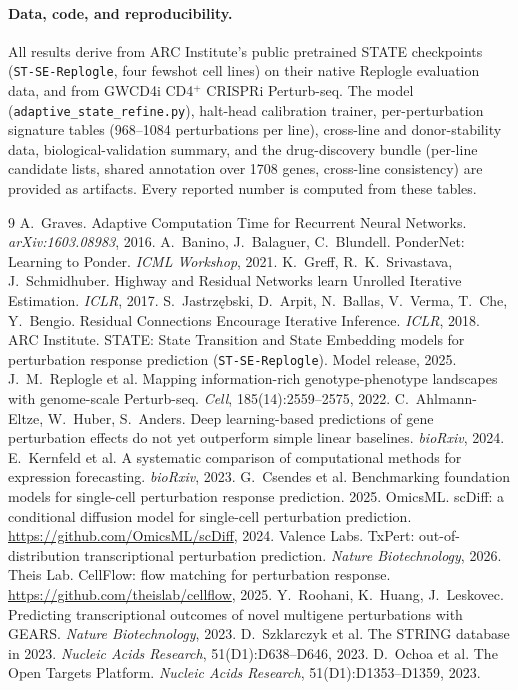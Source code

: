 \documentclass[11pt]{article}
\begin{document}
\paragraph{Data, code, and reproducibility.} All results derive from ARC Institute's public
pretrained STATE checkpoints (\texttt{ST-SE-Replogle}, four fewshot cell lines) on their native
Replogle evaluation data, and from GWCD4i CD4$^+$ CRISPRi Perturb-seq. The model
(\texttt{adaptive\_state\_refine.py}), halt-head calibration trainer, per-perturbation signature tables (968--1084
perturbations per line), cross-line and donor-stability data, biological-validation summary, and
the drug-discovery bundle (per-line candidate lists, shared annotation over 1708 genes, cross-line
consistency) are provided as artifacts. Every reported number is computed from these tables.

\begin{thebibliography}{9}
\small
{} A.~Graves. Adaptive Computation Time for Recurrent Neural Networks.
\emph{arXiv:1603.08983}, 2016.
 A.~Banino, J.~Balaguer, C.~Blundell. PonderNet: Learning to Ponder.
\emph{ICML Workshop}, 2021.
 K.~Greff, R.~K.~Srivastava, J.~Schmidhuber. Highway and Residual
Networks learn Unrolled Iterative Estimation. \emph{ICLR}, 2017.
 S.~Jastrz\k{e}bski, D.~Arpit, N.~Ballas, V.~Verma, T.~Che,
Y.~Bengio. Residual Connections Encourage Iterative Inference. \emph{ICLR}, 2018.
 ARC Institute. STATE: State Transition and State Embedding models for
perturbation response prediction (\texttt{ST-SE-Replogle}). Model release, 2025.
 J.~M.~Replogle et al. Mapping information-rich genotype-phenotype landscapes
with genome-scale Perturb-seq. \emph{Cell}, 185(14):2559--2575, 2022.
 C.~Ahlmann-Eltze, W.~Huber, S.~Anders. Deep learning-based predictions of
gene perturbation effects do not yet outperform simple linear baselines. \emph{bioRxiv}, 2024.
 E.~Kernfeld et al. A systematic comparison of computational methods for
expression forecasting. \emph{bioRxiv}, 2023.
 G.~Csendes et al. Benchmarking foundation models for single-cell
perturbation response prediction. 2025.
 OmicsML. scDiff: a conditional diffusion model for single-cell perturbation
prediction. \url{https://github.com/OmicsML/scDiff}, 2024.
 Valence Labs. TxPert: out-of-distribution transcriptional perturbation
prediction. \emph{Nature Biotechnology}, 2026.
 Theis Lab. CellFlow: flow matching for perturbation response.
\url{https://github.com/theislab/cellflow}, 2025.
 Y.~Roohani, K.~Huang, J.~Leskovec. Predicting transcriptional outcomes of
novel multigene perturbations with GEARS. \emph{Nature Biotechnology}, 2023.
 D.~Szklarczyk et al. The STRING database in 2023. \emph{Nucleic Acids
Research}, 51(D1):D638--D646, 2023.
 D.~Ochoa et al. The Open Targets Platform. \emph{Nucleic Acids
Research}, 51(D1):D1353--D1359, 2023.
\end{thebibliography}
\end{document}
